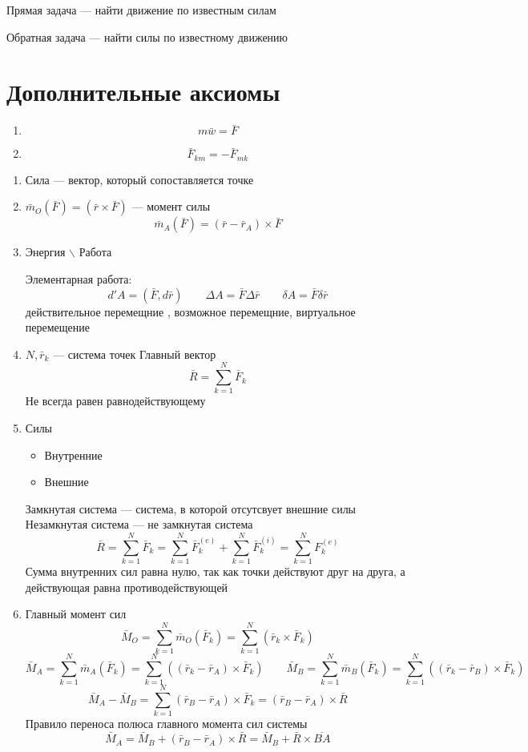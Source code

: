\documentclass[crop=false]{standalone}
\begin{document}
Прямая задача — найти движение по известным силам

Обратная задача — найти силы по известному движению
\section{Дополнительные аксиомы}
\begin{enumerate}
    \item \[m\bar w = \bar F \]
    \item \[\bar F_{k m} = -\bar F_{m k} \]
\end{enumerate}
\begin{enumerate}
    \item 
    \Def Сила — вектор, который сопоставляется точке
    
    \item
    \Def $\bar m_O (\bar F) = (\bar r \times \bar F)$ — момент силы
    \[\bar m_A (\bar F) = (\bar r - \bar r_A) \times \bar F\]

    \item Энергия $\backslash$ Работа 
    
    Элементарная работа:
\[d' A = (\bar F , d \bar r) \qquad \Delta A = \bar F \Delta \bar r \qquad \delta A = \bar F \delta \bar r\]
действительное перемещние , возможное перемещние, виртуальное перемещение

    \item
    $N, \bar r_k$ — система точек
    \Def Главный вектор
    \[\bar R = \sum_{k=1}^N \bar F_k\]
    Не всегда равен равнодействующему

    \item 
    Силы  %
    \begin{itemize}
        \item Внутренние
        \item Внешние
    \end{itemize}
    \Def Замкнутая система — система, в которой отсутсвует внешние силы
    \Def Незамкнутая система — не замкнутая система
    \[\bar R = \sum_{k=1}^N \bar F_k = \sum_{k=1}^N \bar F_k^{(e)} + \sum_{k=1}^N \bar F_k^{(i)} = \sum_{k=1}^N F_k^{(e)}\]
    Сумма внутренних сил равна нулю, так как точки действуют друг на друга, а действующая равна противодействующей 

    \item 
    \Def Главный момент сил
    \[\bar M_O = \sum_{k=1}^N \bar m_O(\bar F_k) = \sum_{k=1}^{N} (\bar r_k \times \bar F_k)\]
    \[\bar M_A = \sum_{k=1}^N \bar m_A(\bar F_k) = \sum_{k=1}^{N} ((\bar r_k - \bar r_A)\times \bar F_k)\qquad \bar M_B = \sum_{k=1}^N \bar m_B(\bar F_k) = \sum_{k=1}^{N} ((\bar r_k - \bar r_B)\times \bar F_k)\]
    \[\bar M_A - \bar M_B = \sum_{k=1}^{N} (\bar r_B - \bar r_A) \times \bar F_k = (\bar r_B - \bar r_A) \times \bar R\]
    Правило переноса полюса главного момента сил системы
    \[\boxed{\bar M_A = \bar M_B + (\bar r_B - \bar r_A) \times \bar R} = \bar M_B + \bar R \times \overline{BA}\]
    

\end{enumerate}
\end{document}
